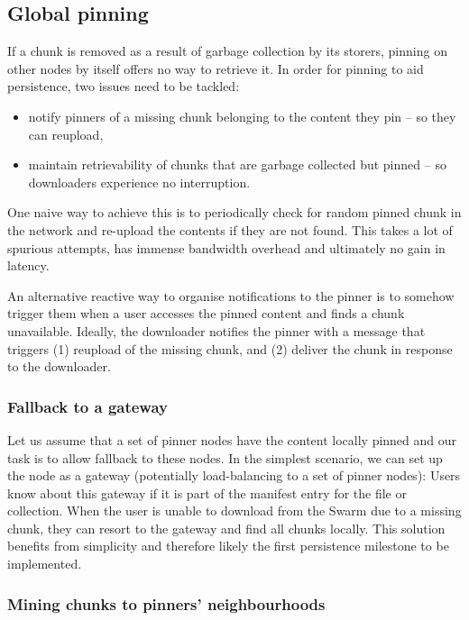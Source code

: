 \subsection{Global pinning}\label{sec:global-pinning}

If a chunk is removed as a result of garbage collection by its storers, pinning on other nodes by itself offers no way to retrieve it. In order for pinning to aid persistence, two issues need to be tackled:

\begin{itemize}
    \item  notify pinners of a missing chunk belonging to the content they pin -- so they can reupload,
    \item  maintain retrievability of chunks that are garbage collected but pinned -- so downloaders experience no interruption. 
\end{itemize}

One naive way to achieve this is to periodically check for random pinned chunk in the network and re-upload the contents if they are not found. This takes a lot of spurious attempts, has immense bandwidth overhead and ultimately no gain in latency.

An alternative reactive way to organise notifications to the pinner is to somehow trigger them when a user accesses the pinned content and finds a chunk unavailable. Ideally, the downloader notifies the pinner with a message that triggers (1) reupload of the missing chunk, and (2) deliver the chunk in response to the downloader.  

\subsubsection{Fallback to a gateway}

Let us assume that a set of pinner nodes have the content locally pinned and our task is to allow fallback to these nodes. In the simplest scenario, we can set up the node as a gateway (potentially load-balancing to a set of pinner nodes): Users know about this gateway if it is part of the manifest entry for the file or collection. When the user is unable to download from the Swarm due to a missing chunk, they can resort to the gateway and find all chunks locally.
This solution benefits from simplicity and therefore likely the first persistence milestone to be implemented.  

\subsubsection{Mining chunks to pinners' neighbourhoods}

